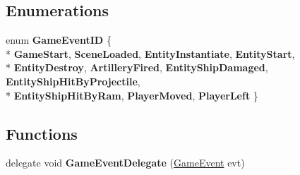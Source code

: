 \subsection*{Enumerations}
\begin{DoxyCompactItemize}
\item 
enum {\bfseries Game\-Event\-I\-D} \{ \\*
{\bfseries Game\-Start}, 
{\bfseries Scene\-Loaded}, 
{\bfseries Entity\-Instantiate}, 
{\bfseries Entity\-Start}, 
\\*
{\bfseries Entity\-Destroy}, 
{\bfseries Artillery\-Fired}, 
{\bfseries Entity\-Ship\-Damaged}, 
{\bfseries Entity\-Ship\-Hit\-By\-Projectile}, 
\\*
{\bfseries Entity\-Ship\-Hit\-By\-Ram}, 
{\bfseries Player\-Moved}, 
{\bfseries Player\-Left}
 \}
\end{DoxyCompactItemize}
\subsection*{Functions}
\begin{DoxyCompactItemize}
\item 
\hypertarget{namespace_skyrates_1_1_client_1_1_game_1_1_event_a448e5d409dc993bd700f2f7f8161adf7}{delegate void {\bfseries Game\-Event\-Delegate} (\hyperlink{class_skyrates_1_1_client_1_1_game_1_1_event_1_1_game_event}{Game\-Event} evt)}\label{namespace_skyrates_1_1_client_1_1_game_1_1_event_a448e5d409dc993bd700f2f7f8161adf7}

\end{DoxyCompactItemize}
